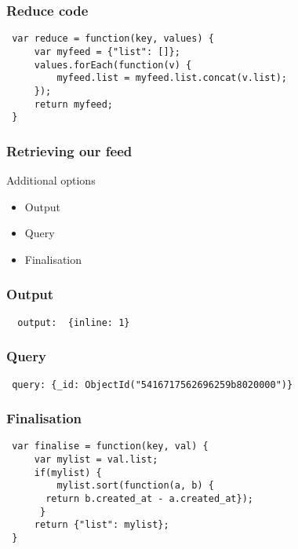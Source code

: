 \documentclass[10pt]{beamer}
\begin{document}
\begin{frame}[fragile]
  \frametitle{Reduce code}

 \begin{verbatim}
 var reduce = function(key, values) {
     var myfeed = {"list": []};
     values.forEach(function(v) {
         myfeed.list = myfeed.list.concat(v.list);
     });
     return myfeed;
 }
	     \end{verbatim}

\end{frame}


\begin{frame}
  \frametitle{Retrieving our feed}

  Additional options
 \begin{itemize}
  \item Output
  \item Query
  \item Finalisation
 \end{itemize}


\end{frame}
\begin{frame}[fragile]

  \frametitle{Output}

 \begin{verbatim}
  output:  {inline: 1}
 \end{verbatim}

\end{frame}


\begin{frame}[fragile]
  \frametitle{Query}

 \begin{verbatim}
 query: {_id: ObjectId("5416717562696259b8020000")}
 \end{verbatim}

\end{frame}


\begin{frame}[fragile]
  \frametitle{Finalisation}

 \begin{verbatim}
 var finalise = function(key, val) {
     var mylist = val.list;
     if(mylist) {
         mylist.sort(function(a, b) { 
	   return b.created_at - a.created_at});
      }
     return {"list": mylist};
 }

 \end{verbatim}

\end{frame}
\end{document}
